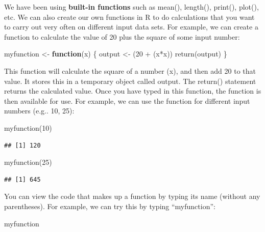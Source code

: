 \documentclass[
]{book}
\newenvironment{Shaded}{\begin{snugshade}}{\end{snugshade}}
\newcommand{\ControlFlowTok}[1]{\textcolor[rgb]{0.13,0.29,0.53}{\textbf{#1}}}
\newcommand{\DecValTok}[1]{\textcolor[rgb]{0.00,0.00,0.81}{#1}}
\newcommand{\FunctionTok}[1]{\textcolor[rgb]{0.00,0.00,0.00}{#1}}
\newcommand{\NormalTok}[1]{#1}
\newcommand{\OtherTok}[1]{\textcolor[rgb]{0.56,0.35,0.01}{#1}}
\newcommand{\SpecialCharTok}[1]{\textcolor[rgb]{0.00,0.00,0.00}{#1}}
\begin{document}
We have been using \textbf{built-in functions} such as mean(), length(), print(), plot(), etc. We can also create our own functions in R to do calculations that you want to carry out very often on different input data sets. For example, we can create a function to calculate the value of 20 plus the square of some input number:

\begin{Shaded}
\begin{Highlighting}[]
\NormalTok{myfunction }\OtherTok{\textless{}{-}} \ControlFlowTok{function}\NormalTok{(x) \{ }
\NormalTok{  output }\OtherTok{\textless{}{-}}\NormalTok{ (}\DecValTok{20} \SpecialCharTok{+}\NormalTok{ (x}\SpecialCharTok{*}\NormalTok{x)) }
  \FunctionTok{return}\NormalTok{(output)}
\NormalTok{  \}}
\end{Highlighting}
\end{Shaded}

This function will calculate the square of a number (x), and then add 20 to that value. It stores this in a temporary object called output. The return() statement returns the calculated value. Once you have typed in this function, the function is then available for use. For example, we can use the function for different input numbers (e.g.. 10, 25):

\begin{Shaded}
\begin{Highlighting}[]
\FunctionTok{myfunction}\NormalTok{(}\DecValTok{10}\NormalTok{)}
\end{Highlighting}
\end{Shaded}

\begin{verbatim}
## [1] 120
\end{verbatim}

\begin{Shaded}
\begin{Highlighting}[]
\FunctionTok{myfunction}\NormalTok{(}\DecValTok{25}\NormalTok{)}
\end{Highlighting}
\end{Shaded}

\begin{verbatim}
## [1] 645
\end{verbatim}

You can view the code that makes up a function by typing its name (without any parentheses). For example, we can try this by typing ``myfunction'':

\begin{Shaded}
\begin{Highlighting}[]
\NormalTok{myfunction}
\end{Highlighting}
\end{Shaded}
\end{document}
